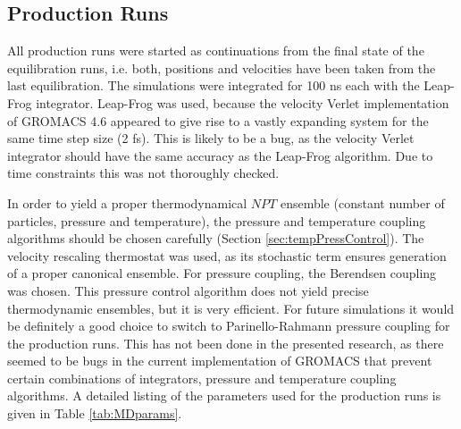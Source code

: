 \documentclass[english, a4paper, 12pt, titlepage, draft]{article}
\begin{document}

\subsection{Production Runs}

All production runs were started as continuations from the final state of the equilibration runs, i.e. both, positions and velocities have been taken from the last equilibration.
The simulations were integrated for 100 ns each with the Leap-Frog integrator.
Leap-Frog was used, because the velocity Verlet implementation of GROMACS 4.6 appeared to give rise to a vastly expanding system for the same time step size (2 fs).
This is likely to be a bug, as the velocity Verlet integrator should have the same accuracy as the Leap-Frog algorithm.
Due to time constraints this was not thoroughly checked.

In order to yield a proper thermodynamical $NPT$ ensemble (constant number of particles, pressure and temperature), the pressure and temperature coupling algorithms should be chosen carefully (Section \ref{sec:tempPressControl}).
The velocity rescaling thermostat was used, as its stochastic term ensures generation of a proper canonical ensemble.
For pressure coupling, the Berendsen coupling was chosen.
This pressure control algorithm does not yield precise thermodynamic ensembles, but it is very efficient.
For future simulations it would be definitely a good choice to switch to Parinello-Rahmann pressure coupling for the production runs.
This has not been done in the presented research, as there seemed to be bugs in the current implementation of GROMACS that prevent certain combinations of integrators, pressure and temperature coupling algorithms.
A detailed listing of the parameters used for the production runs is given in Table \ref{tab:MDparams}.
\end{document}
